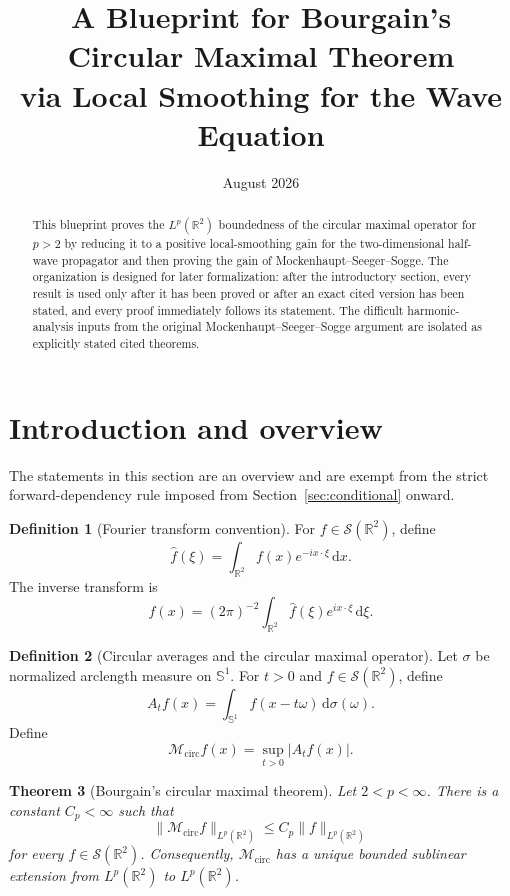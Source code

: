 \documentclass[11pt]{article}
\title{A Blueprint for Bourgain's Circular Maximal Theorem\\via Local Smoothing for the Wave Equation}
\author{}
\date{August 2026}
\numberwithin{equation}{section}
\newtheorem{theorem}{Theorem}[section]
\theoremstyle{definition}
\newtheorem{definition}[theorem]{Definition}
\theoremstyle{remark}
\newcommand{\R}{\mathbb R}
\newcommand{\Sph}{\mathbb S}
\newcommand{\Sch}{\mathcal S}
\newcommand{\Mcirc}{\mathcal M_{\mathrm{circ}}}
\newcommand{\dd}{\,\mathrm d}
\begin{document}
\maketitle

\begin{abstract}
This blueprint proves the $L^p(\R^2)$ boundedness of the circular maximal operator for $p>2$ by reducing it to a positive local-smoothing gain for the two-dimensional half-wave propagator and then proving the gain of Mockenhaupt--Seeger--Sogge.  The organization is designed for later formalization: after the introductory section, every result is used only after it has been proved or after an exact cited version has been stated, and every proof immediately follows its statement.  The difficult harmonic-analysis inputs from the original Mockenhaupt--Seeger--Sogge argument are isolated as explicitly stated cited theorems.
\end{abstract}

\tableofcontents

\section{Introduction and overview}

The statements in this section are an overview and are exempt from the strict forward-dependency rule imposed from Section~\ref{sec:conditional} onward.

\begin{definition}[Fourier transform convention]\label{def:fourier-convention}
For $f\in\Sch(\R^2)$, define
\[
\widehat f(\xi)=\int_{\R^2}f(x)e^{-ix\cdot\xi}\dd x.
\]
The inverse transform is
\[
f(x)=(2\pi)^{-2}\int_{\R^2}\widehat f(\xi)e^{ix\cdot\xi}\dd\xi.
\]
\end{definition}

\begin{definition}[Circular averages and the circular maximal operator]\label{def:circular-average}
Let $\sigma$ be normalized arclength measure on $\Sph^1$.  For $t>0$ and $f\in\Sch(\R^2)$, define
\[
A_tf(x)=\int_{\Sph^1}f(x-t\omega)\dd\sigma(\omega).
\]
Define
\[
\Mcirc f(x)=\sup_{t>0}|A_tf(x)|.
\]
\end{definition}

\begin{theorem}[Bourgain's circular maximal theorem]\label{thm:intro-bourgain}
Let $2<p<\infty$.  There is a constant $C_p<\infty$ such that
\[
\|\Mcirc f\|_{L^p(\R^2)}\le C_p\|f\|_{L^p(\R^2)}
\]
for every $f\in\Sch(\R^2)$.  Consequently, $\Mcirc$ has a unique bounded sublinear extension from $L^p(\R^2)$ to $L^p(\R^2)$.
\end{theorem}
\end{document}
